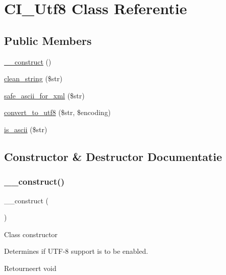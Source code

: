 \hypertarget{class_c_i___utf8}{}\section{C\+I\+\_\+\+Utf8 Class Referentie}
\label{class_c_i___utf8}
\subsection*{Public Members}
\begin{DoxyCompactItemize}
\item 
\mbox{\hyperlink{class_c_i___utf8_a095c5d389db211932136b53f25f39685}{\+\_\+\+\_\+construct}} ()
\item 
\mbox{\hyperlink{class_c_i___utf8_af9fc6214803042dd0b46d6ac5bdb4b7b}{clean\+\_\+string}} (\$str)
\item 
\mbox{\hyperlink{class_c_i___utf8_a10d712b507a87fd841f134143eaedb8e}{safe\+\_\+ascii\+\_\+for\+\_\+xml}} (\$str)
\item 
\mbox{\hyperlink{class_c_i___utf8_a7f6a8b9f00d7d11b23abcadfc91e9583}{convert\+\_\+to\+\_\+utf8}} (\$str, \$encoding)
\item 
\mbox{\hyperlink{class_c_i___utf8_a8676dd1e98c759c6ef90fe6a9ba4e119}{is\+\_\+ascii}} (\$str)
\end{DoxyCompactItemize}


\subsection{Constructor \& Destructor Documentatie}
\mbox{\label{class_c_i___utf8_a095c5d389db211932136b53f25f39685}} 
\subsubsection{\texorpdfstring{\_\_construct()}{\_\_construct()}}
{\footnotesize\ttfamily \+\_\+\+\_\+construct (\begin{DoxyParamCaption}{ }\end{DoxyParamCaption})}

Class constructor

Determines if U\+T\+F-\/8 support is to be enabled.

\begin{DoxyReturn}{Retourneert}
void 
\end{DoxyReturn}


